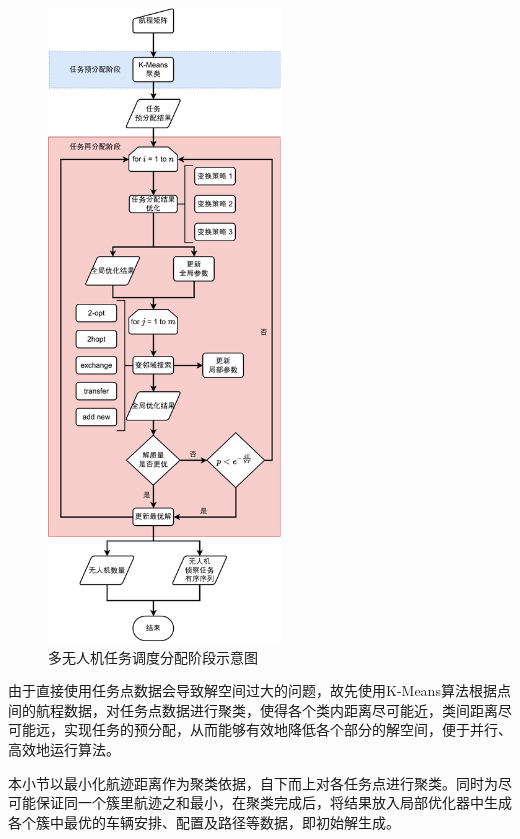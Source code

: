 \begin{figure}[!htbp]
    \centering
    \includegraphics[width=0.55\textwidth]{images/多无人机任务调度分配阶段示意图.pdf}
    \caption{多无人机任务调度分配阶段示意图}
    \label{fig:多无人机任务调度分配阶段示意图}
\end{figure}

由于直接使用任务点数据会导致解空间过大的问题，故先使用K-Means算法根据点间的航程数据，对任务点数据进行聚类，使得各个类内距离尽可能近，类间距离尽可能远，实现任务的预分配，从而能够有效地降低各个部分的解空间，便于并行、高效地运行算法。

本小节以最小化航迹距离作为聚类依据，自下而上对各任务点进行聚类。同时为尽可能保证同一个簇里航迹之和最小，在聚类完成后，将结果放入局部优化器中生成各个簇中最优的车辆安排、配置及路径等数据，即初始解生成。

